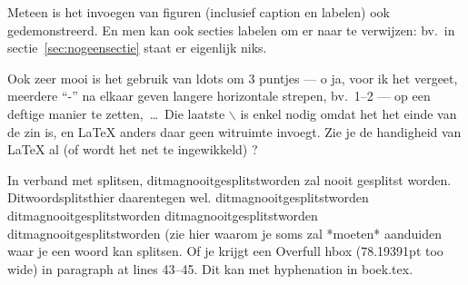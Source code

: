 Meteen is het invoegen van figuren (inclusief caption en labelen) ook gedemonstreerd. En men kan ook secties labelen om er naar te verwijzen: bv.\ in
sectie~\ref{sec:nogeensectie} staat er eigenlijk niks.

Ook zeer mooi is het gebruik van ldots om 3 puntjes --- o ja, voor ik het vergeet, meerdere ``-'' na elkaar geven langere horizontale strepen, bv.\ 1--2 --- op een
deftige manier te zetten,~\ldots\ Die laatste $\backslash$ is enkel nodig omdat het het einde van de zin is, en LaTeX anders daar geen witruimte
invoegt. Zie je de handigheid van LaTeX al (of wordt het net te ingewikkeld) ?

In verband met splitsen, ditmagnooitgesplitstworden zal nooit gesplitst worden. Ditwoordsplitsthier daarentegen wel. ditmagnooitgesplitstworden
ditmagnooitgesplitstworden ditmagnooitgesplitstworden ditmagnooitgesplitstworden (zie hier waarom je soms zal *moeten* aanduiden waar je een woord kan
splitsen. Of je krijgt een Overfull hbox (78.19391pt too wide) in paragraph at lines 43--45. Dit kan met hyphenation in boek.tex.






